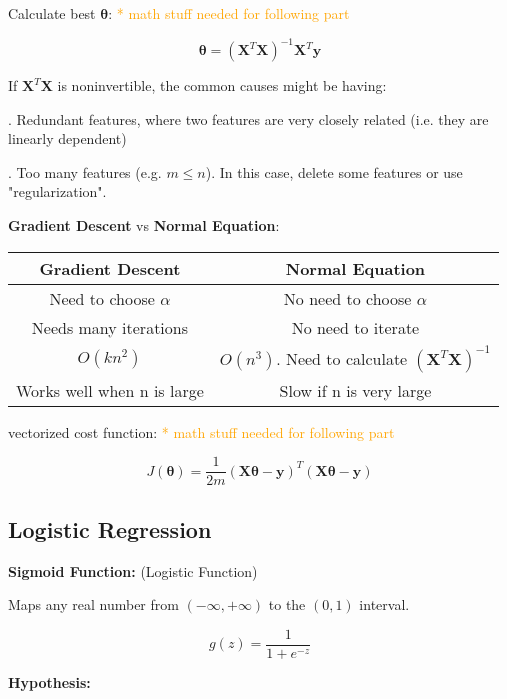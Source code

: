 \documentclass{article}
\begin{document}
\noindent Calculate best \(\boldsymbol{\theta}\): \textcolor{orange}{ * math stuff needed for following part}

\[
\boldsymbol{\theta} = (\textbf{X}^T\textbf{X})^{-1}\textbf{X}^T\textbf{y}
\]

\noindent If \(\textbf{X}^T\textbf{X}\) is noninvertible, the common causes might be having:

. Redundant features, where two features are very closely related (i.e. they are linearly dependent)

. Too many features (e.g. \(m \leq n\)). In this case, delete some features or use "regularization".

\bigskip

\noindent \textbf{Gradient Descent} vs \textbf{Normal Equation}:

\begin{center}
\begin{tabular}{ | c | c | } 
\hline
\textbf{Gradient Descent} & \textbf{Normal Equation} \\ 
\hline
Need to choose \(\alpha\) & No need to choose \(\alpha\) \\ 
\hline
Needs many iterations & No need to iterate \\ 
\hline
\(O(kn^2)\) & \(O(n^3)\). Need to calculate \((\textbf{X}^T\textbf{X})^{-1}\) \\ 
\hline
Works well when n is large & Slow if n is very large \\ 
\hline
\end{tabular}
\end{center}

\bigskip

\noindent vectorized cost function: \textcolor{orange}{ * math stuff needed for following part}

\[J(\boldsymbol{\theta}) = \frac{1}{2m} (\textbf{X}\boldsymbol{\theta} - \textbf{y})^T(\textbf{X}\boldsymbol{\theta} - \textbf{y})\]

\subsection{Logistic Regression}

\noindent \textbf{Sigmoid Function:} (Logistic Function)

\noindent Maps any real number from \((-\infty, +\infty)\) to the \((0, 1)\) interval.

\[g(z) = \frac{1}{1 + e^{-z}}\]

\noindent \textbf{Hypothesis:}
\end{document}
